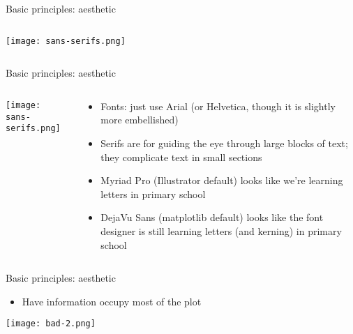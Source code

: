 \documentclass[10pt]{beamer}
\begin{document}
\begin{frame}{Basic principles: aesthetic}
  \begin{columns}
        \begin{column}{0.6\textwidth}
      \texttt{[image: sans-serifs.png]}
    \end{column}
    \begin{column}{0.5\textwidth}
     \end{column}
    \end{columns}
\end{frame}

\begin{frame}{Basic principles: aesthetic}
  \begin{columns}
        \begin{column}{0.6\textwidth}
      \texttt{[image: sans-serifs.png]}
    \end{column}
    \begin{column}{0.5\textwidth}
    \begin{itemize}
    \item Fonts: just use Arial (or Helvetica, though it is slightly more embellished)
    \item Serifs are for guiding the eye through large blocks of text; they complicate text in small sections
    \item Myriad Pro (Illustrator default) looks like we're learning letters in primary school
      \item DejaVu Sans (matplotlib default) looks like the font designer is still learning letters (and kerning) in primary school
    \end{itemize}
    \end{column}
    \end{columns}
\end{frame}

\begin{frame}{Basic principles: aesthetic}
    \begin{itemize}
    \item Have information occupy most of the plot
    \end{itemize}
    \texttt{[image: bad-2.png]}
\end{frame}
\end{document}
